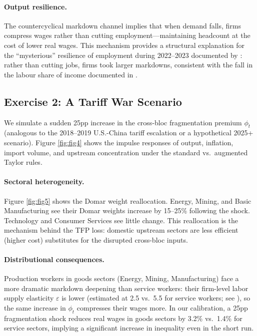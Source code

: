 \paragraph{Output resilience.}
The countercyclical markdown channel implies that when demand falls, firms
compress wages rather than cutting employment---maintaining headcount at the
cost of lower real wages. This mechanism provides a structural explanation
for the ``mysterious'' resilience of employment during 2022--2023 documented
by \citet{domash2022}: rather than cutting jobs, firms took larger markdowns,
consistent with the fall in the labour share of income documented in
\citet{rinz2022labor}.

\subsection{Exercise 2: A Tariff War Scenario}
\label{sec:exercise2}

We simulate a sudden 25pp increase in the cross-bloc fragmentation premium
$\phi_t$ (analogous to the 2018--2019 U.S.-China tariff escalation or a
hypothetical 2025+ scenario). Figure \ref{fig:fig4} shows the impulse
responses of output, inflation, import volume, and upstream concentration
under the standard vs.\ augmented Taylor rules.

\paragraph{Sectoral heterogeneity.}
Figure \ref{fig:fig5} shows the Domar weight reallocation. Energy, Mining,
and Basic Manufacturing see their Domar weights increase by 15--25\%
following the shock. Technology and Consumer Services see little change.
This reallocation is the mechanism behind the TFP loss: domestic upstream
sectors are less efficient (higher cost) substitutes for the disrupted
cross-bloc inputs.

\paragraph{Distributional consequences.}
Production workers in goods sectors (Energy, Mining, Manufacturing) face a
more dramatic markdown deepening than service workers: their firm-level
labor supply elasticity $\varepsilon$ is lower (estimated at 2.5 vs.\ 5.5
for service workers; see \citet{dube2020monopsony}), so the same increase
in $\phi_t$ compresses their wages more. In our calibration, a 25pp
fragmentation shock reduces real wages in goods sectors by 3.2\% vs.\ 1.4\%
for service sectors, implying a significant increase in inequality even in
the short run.

